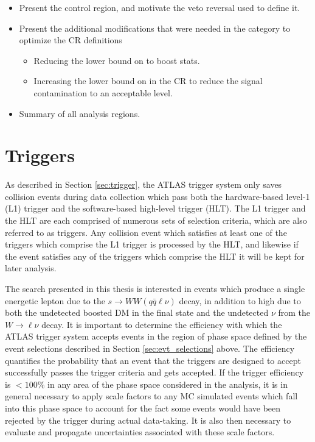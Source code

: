 \begin{itemize}
\item Present the \ttbar control region, and motivate the \bjet veto reversal used to define it.
\item Present the additional modifications that were needed in the \merged category to optimize the CR definitions
\begin{itemize}
\item Reducing the lower bound on \metsig to boost stats.
\item Increasing the lower bound on \dR in the \wjets CR to reduce the signal contamination to an acceptable level.
\end{itemize}
\item Summary of all analysis regions.
\end{itemize}

\section{Triggers}
\label{sec:triggers_evt_selection}

As described in Section \ref{sec:trigger}, the ATLAS trigger system only saves collision events during data collection which pass both the hardware-based level-1 (L1) trigger and the software-based high-level trigger (HLT). The L1 trigger and the HLT are each comprised of numerous sets of selection criteria, which are also referred to as triggers. Any collision event which satisfies at least one of the triggers which comprise the L1 trigger is processed by the HLT, and likewise if the event satisfies any of the triggers which comprise the HLT it will be kept for later analysis.

The search presented in this thesis is interested in events which produce a single energetic lepton due to the \(s\rightarrow WW(q\bar{q}\ell\nu)\) decay, in addition to high \met due to both the undetected boosted DM in the final state and the undetected \(\nu\) from the \(W\rightarrow \ell\nu\) decay. It is important to determine the efficiency with which the ATLAS trigger system accepts events in the region of phase space defined by the event selections described in Section \ref{sec:evt_selections} above. The efficiency quantifies the probability that an event that the triggers are designed to accept successfully passes the trigger criteria and gets accepted. If the trigger efficiency is \(<100\%\) in any area of the phase space considered in the analysis, it is in general necessary to apply scale factors to any MC simulated events which fall into this phase space to account for the fact some events would have been rejected by the trigger during actual data-taking. It is also then necessary to evaluate and propagate uncertainties associated with these scale factors.

